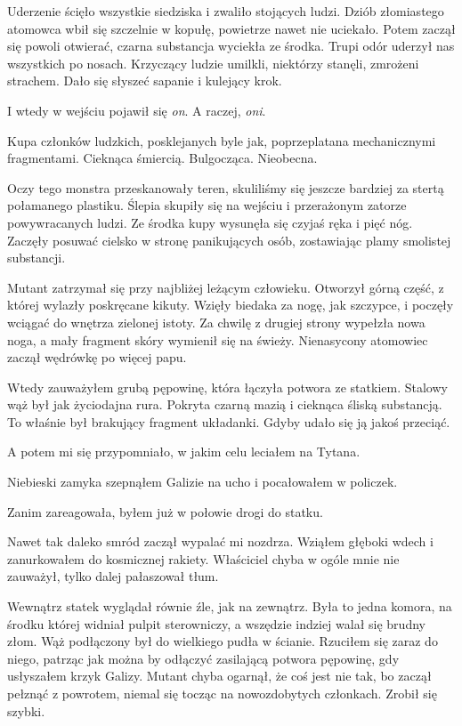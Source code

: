 Uderzenie ścięło wszystkie siedziska i zwaliło stojących ludzi.
Dziób złomiastego atomowca wbił się szczelnie w kopułę, powietrze nawet nie uciekało.
Potem zaczął się powoli otwierać, czarna substancja wyciekła ze środka.
Trupi odór uderzył nas wszystkich po nosach.
Krzyczący ludzie umilkli, niektórzy stanęli, zmrożeni strachem.
Dało się słyszeć sapanie i kulejący krok.

I wtedy w wejściu pojawił się \emph{on}.
A raczej, \emph{oni}.

Kupa członków ludzkich, posklejanych byle jak, poprzeplatana mechanicznymi fragmentami.
Cieknąca śmiercią.
Bulgocząca.
Nieobecna.

Oczy tego monstra przeskanowały teren, skuliliśmy się jeszcze bardziej za stertą połamanego plastiku.
Ślepia skupiły się na wejściu i przerażonym zatorze powywracanych ludzi.
Ze środka kupy wysunęła się czyjaś ręka i pięć nóg.
Zaczęły posuwać cielsko w stronę panikujących osób, zostawiając plamy smolistej substancji.

Mutant zatrzymał się przy najbliżej leżącym człowieku.
Otworzył górną część, z której wylazły poskręcane kikuty.
Wzięły biedaka za nogę, jak szczypce, i poczęły wciągać do wnętrza zielonej istoty.
Za chwilę z drugiej strony wypełzła nowa noga, a mały fragment skóry wymienił się na świeży.
Nienasycony atomowiec zaczął wędrówkę po więcej papu.

Wtedy zauważyłem grubą pępowinę, która łączyła potwora ze statkiem.
Stalowy wąż był jak życiodajna rura.
Pokryta czarną mazią i cieknąca śliską substancją.
To właśnie był brakujący fragment układanki.
Gdyby udało się ją jakoś przeciąć.

A potem mi się przypomniało, w jakim celu leciałem na Tytana.
\begin{dialogue}
	\ds{} Niebieski zamyka \dm{} szepnąłem Galizie na ucho i pocałowałem w policzek.
\end{dialogue}

Zanim zareagowała, byłem już w połowie drogi do statku.

Nawet tak daleko smród zaczął wypalać mi nozdrza.
Wziąłem głęboki wdech i zanurkowałem do kosmicznej rakiety.
Właściciel chyba w ogóle mnie nie zauważył, tylko dalej pałaszował tłum.

Wewnątrz statek wyglądał równie źle, jak na zewnątrz.
Była to jedna komora, na środku której widniał pulpit sterowniczy, a wszędzie indziej walał się brudny złom.
Wąż podłączony był do wielkiego pudła w ścianie.
Rzuciłem się zaraz do niego, patrząc jak można by odłączyć zasilającą potwora pępowinę, gdy usłyszałem krzyk Galizy.
Mutant chyba ogarnął, że coś jest nie tak, bo zaczął pełznąć z powrotem, niemal się tocząc na nowozdobytych członkach.
Zrobił się szybki.

